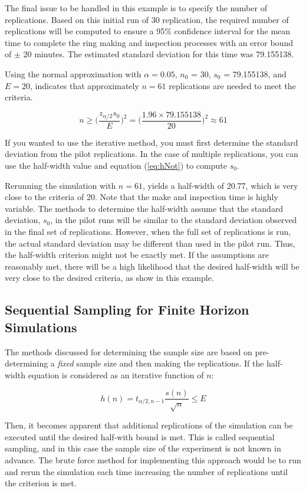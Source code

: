 \documentclass[
]{book}
\theoremstyle{definition}
\theoremstyle{definition}
\theoremstyle{definition}
\theoremstyle{definition}
\theoremstyle{remark}
\begin{document}
The final issue to be handled in this example is to specify the number
of replications. Based on this initial run of 30 replication, the
required number of replications will be computed to ensure a 95\%
confidence interval for the mean time to complete the ring making and
inspection processes with an error bound of \(\pm\) 20 minutes. The
estimated standard deviation for this time was 79.155138.

Using the normal approximation with \(\alpha = 0.05\), \(n_0\) = 30, \(s_0\) =
79.155138, and \(E = 20\), indicates that approximately \(n = 61\)
replications are needed to meet the criteria.

\[
n \geq \biggl(\dfrac{z_{\alpha/2} s_0}{E}\biggr)^2 = \biggl(\dfrac{1.96 \times 79.155138}{20}\biggr)^2 \approx 61
\]

If you wanted to use the iterative method, you must first determine the
standard deviation from the pilot replications. In the case of multiple
replications, you can use the half-width value and equation (\eqref{eq:hNot}) to compute \(s_0\).

Rerunning the simulation with \(n = 61\), yields a half-width of 20.77,
which is very close to the criteria of 20. Note that the make and
inspection time is highly variable. The methods to determine the
half-width assume that the standard deviation, \(s_0\), in the pilot runs
will be similar to the standard deviation observed in the final set of
replications. However, when the full set of replications is run, the
actual standard deviation may be different than used in the pilot run.
Thus, the half-width criterion might not be exactly met. If the
assumptions are reasonably met, there will be a high likelihood that the
desired half-width will be very close to the desired criteria, as show
in this example.

\hypertarget{simoa:seqsampling}{%
\subsection{Sequential Sampling for Finite Horizon Simulations}\label{simoa:seqsampling}}

The methods discussed for determining the sample size are based on
pre-determining a \emph{fixed} sample size and then making the replications.
If the half-width equation is considered as an iterative function of
\(n\):

\[h(n) = t_{\alpha/2, n - 1} \dfrac{s(n)}{\sqrt{n}} \leq E\]

Then, it becomes apparent that additional replications of the simulation
can be executed until the desired half-with bound is met. This is called
sequential sampling, and in this case the sample size of the experiment
is not known in advance. The brute force method for implementing this
approach would be to run and rerun the simulation each time increasing
the number of replications until the criterion is met.
\end{document}
